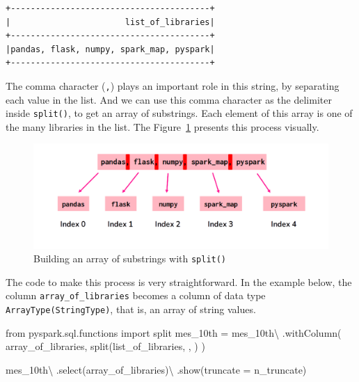 \documentclass[
  11pt,
  letterpaper,
  DIV=11,
  numbers=noendperiod]{scrreprt}
\newenvironment{Shaded}{\begin{snugshade}}{\end{snugshade}}
\newcommand{\ImportTok}[1]{\textcolor[rgb]{0.00,0.46,0.62}{#1}}
\newcommand{\NormalTok}[1]{\textcolor[rgb]{0.00,0.23,0.31}{#1}}
\newcommand{\OperatorTok}[1]{\textcolor[rgb]{0.37,0.37,0.37}{#1}}
\newcommand{\StringTok}[1]{\textcolor[rgb]{0.13,0.47,0.30}{#1}}
\begin{document}
\begin{verbatim}
+----------------------------------------+
|                       list_of_libraries|
+----------------------------------------+
|pandas, flask, numpy, spark_map, pyspark|
+----------------------------------------+
\end{verbatim}

The comma character (\texttt{,}) plays an important role in this string,
by separating each value in the list. And we can use this comma
character as the delimiter inside \texttt{split()}, to get an array of
substrings. Each element of this array is one of the many libraries in
the list. The Figure~\ref{fig-string-split} presents this process
visually.

\begin{figure}

{\centering \includegraphics{Chapters/./../Figures/string-split.png}

}

\caption{\label{fig-string-split}Building an array of substrings with
\texttt{split()}}

\end{figure}

The code to make this process is very straightforward. In the example
below, the column \texttt{array\_of\_libraries} becomes a column of data
type \texttt{ArrayType(StringType)}, that is, an array of string values.

\begin{Shaded}
\begin{Highlighting}[]
\ImportTok{from}\NormalTok{ pyspark.sql.functions }\ImportTok{import}\NormalTok{ split}
\NormalTok{mes\_10th }\OperatorTok{=}\NormalTok{ mes\_10th}\OperatorTok{\textbackslash{}}
\NormalTok{    .withColumn(}
        \StringTok{\textquotesingle{}array\_of\_libraries\textquotesingle{}}\NormalTok{,}
\NormalTok{        split(}\StringTok{\textquotesingle{}list\_of\_libraries\textquotesingle{}}\NormalTok{, }\StringTok{\textquotesingle{}, \textquotesingle{}}\NormalTok{)}
\NormalTok{    )}

\NormalTok{mes\_10th}\OperatorTok{\textbackslash{}}
\NormalTok{    .select(}\StringTok{\textquotesingle{}array\_of\_libraries\textquotesingle{}}\NormalTok{)}\OperatorTok{\textbackslash{}}
\NormalTok{    .show(truncate }\OperatorTok{=}\NormalTok{ n\_truncate)}
\end{Highlighting}
\end{Shaded}
\end{document}
